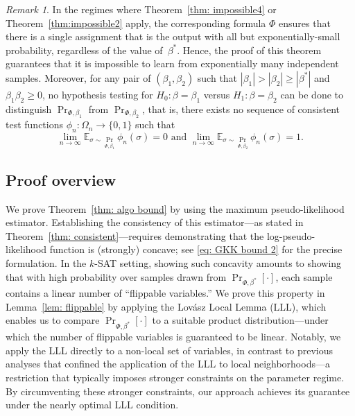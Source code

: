 \documentclass[11pt]{article}
\theoremstyle{definition}
\theoremstyle{remark}
\newtheorem*{remark}{Remark}
\newcommand{\E}{\mathbb{E}}
\begin{document}
 



\begin{remark}
In the regimes where 
Theorem~\ref{thm: impossible4} or Theorem~\ref{thm:impossible2} apply, 
the corresponding formula $\Phi$ ensures that there is a single assignment that is the output with all but exponentially-small probability, regardless of the value of~$\beta^*$.
Hence, the proof of this theorem guarantees that it is impossible to learn from  exponentially many independent samples. 
Moreover, for any pair of $(\beta_1, \beta_2)$ such that $|\beta_1| > |\beta_2|\ge |\beta^*|$ and $\beta_1\beta_2\ge0$, no hypothesis testing for $H_0: \beta =\beta_1$ versus $ H_1: \beta =\beta_2$ can be done to distinguish  $\Pr_{\Phi, \beta_1}$ from  $\Pr_{\Phi, \beta_2}$, that is, there exists no sequence of consistent test functions $\phi_n:\Omega_n \rightarrow\{0,1\}$ such that 
\[
\lim_{n\rightarrow\infty}\E_{\sigma\sim \Pr_{\Phi, \beta_1}} \phi_n(\sigma) = 0 \text{ and } \lim_{n\rightarrow\infty}\E_{\sigma\sim \Pr_{\Phi, \beta_2}} \phi_n(\sigma) = 1.
\]
\end{remark}
 


  

\subsection{Proof overview}
We prove Theorem~\ref{thm: algo bound} by using the maximum pseudo-likelihood estimator. 
Establishing the consistency of this estimator—as stated in Theorem~\ref{thm: consistent}—requires demonstrating that the log-pseudo-likelihood function is (strongly) concave; see \eqref{eq: GKK bound 2} for the precise formulation.  In the 
$k$-SAT setting, showing such concavity amounts to showing that with high probability over samples drawn from $\Pr_{\Phi,\beta^*}[\cdot]$, each sample contains a linear number of “flippable variables.” 
We prove this property in Lemma~\ref{lem: flippable} by applying the Lovász Local Lemma (LLL), which enables us to compare $\Pr_{\Phi,\beta^*}[\cdot]$  to a suitable product distribution—under which the number of flippable variables is guaranteed to be linear. Notably, we apply the LLL directly to a non-local set of variables, in contrast to previous analyses that confined the application of the LLL to local neighborhoods—a restriction that typically imposes stronger constraints on the parameter regime. By circumventing these stronger constraints, our approach achieves its guarantee under the nearly optimal LLL condition.
\end{document}
